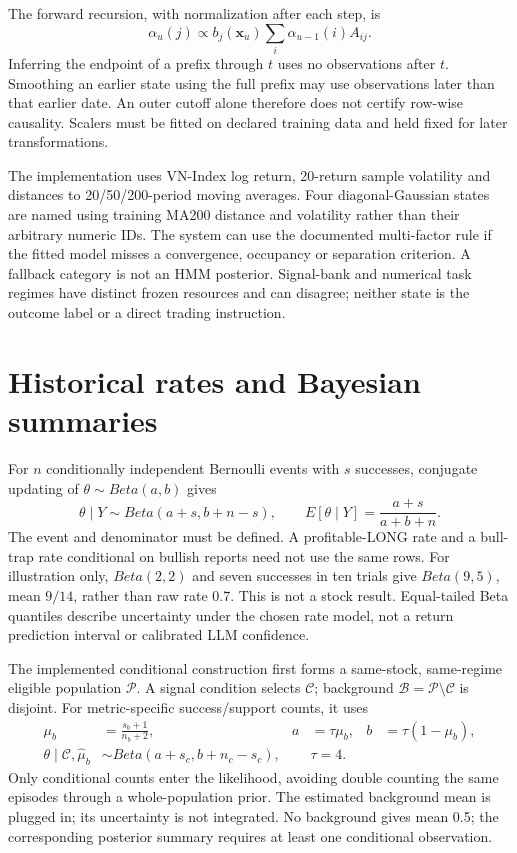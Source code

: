 The forward recursion, with normalization after each step, is
\begin{equation}
\alpha_u(j)\propto b_j(\boldsymbol x_u)\sum_i\alpha_{u-1}(i)A_{ij}.
\end{equation}
Inferring the endpoint of a prefix through $t$ uses no observations after
$t$. Smoothing an earlier state using the full prefix may use observations
later than that earlier date. An outer cutoff alone therefore does not
certify row-wise causality. Scalers must be fitted on declared training
data and held fixed for later transformations.

The implementation uses VN-Index log return, 20-return sample volatility
and distances to 20/50/200-period moving averages. Four diagonal-Gaussian
states are named using training MA200 distance and volatility rather than
their arbitrary numeric IDs. The system can use the documented multi-factor rule if the fitted model
misses a convergence, occupancy or separation criterion. A fallback category
is not an HMM posterior. Signal-bank and numerical task regimes have
distinct frozen resources and can disagree; neither state is the outcome
label or a direct trading instruction.

\section{Historical rates and Bayesian summaries}\label{s:6be2c9c58fe86050}
For $n$ conditionally independent Bernoulli events with $s$ successes,
conjugate updating of $\theta\sim Beta(a,b)$ gives
\begin{equation}
\theta\mid Y\sim Beta(a+s,b+n-s),\qquad
E[\theta\mid Y]=\frac{a+s}{a+b+n}.
\end{equation}
The event and denominator must be defined. A profitable-LONG rate and a
bull-trap rate conditional on bullish reports need not use the same rows.
For illustration only, $Beta(2,2)$ and seven successes in ten trials give
$Beta(9,5)$, mean $9/14$, rather than raw rate 0.7. This is not a stock
result. Equal-tailed Beta quantiles describe uncertainty under the chosen
rate model, not a return prediction interval or calibrated LLM confidence.

The implemented conditional construction first forms a same-stock,
same-regime eligible population $\mathcal P$. A signal condition selects
$\mathcal C$; background $\mathcal B=\mathcal P\setminus\mathcal C$ is
disjoint. For metric-specific success/support counts, it uses
\begin{align}
\mu_b&=\frac{s_b+1}{n_b+2},& a&=\tau\mu_b,&b&=\tau(1-\mu_b),\\
\theta\mid\mathcal C,\widehat\mu_b&\sim Beta(a+s_c,b+n_c-s_c),&&\tau=4.
\end{align}
Only conditional counts enter the likelihood, avoiding double counting
the same episodes through a whole-population prior. The estimated
background mean is plugged in; its uncertainty is not integrated. No
background gives mean 0.5; the corresponding posterior summary requires at least one conditional observation.

